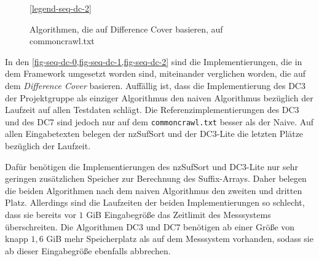 \begin{figure}[ht]

    \medskip
    \ref{legend-seq-dc-2}
    \caption{Algorithmen, die auf Difference Cover basieren, auf commoncrawl.txt}
    \label{fig-seq-dc-2}
\end{figure}
\FloatBarrier

In  den \cref{fig-seq-dc-0,fig-seq-dc-1,fig-seq-dc-2} sind die Implementierungen, die in dem \sacabench Framework umgesetzt worden sind, miteinander verglichen worden, die auf dem \emph{Difference Cover} basieren. Auffällig ist, dass die Implementierung des DC3 der Projektgruppe als einziger Algorithmus den naiven Algorithmus bezüglich der Laufzeit auf allen Testdaten schlägt. Die Referenzimplementierungen des DC3 und des DC7 sind jedoch nur auf dem \texttt{commoncrawl.txt} besser als der Naive. Auf allen Eingabetexten belegen der nzSufSort und der DC3-Lite die letzten Plätze bezüglich der Laufzeit.

Dafür benötigen die Implementierungen des nzSufSort und DC3-Lite nur sehr geringen zusätzlichen Speicher zur Berechnung des Suffix-Arrays. Daher belegen die beiden Algorithmen nach dem naiven Algorithmus den zweiten und dritten Platz. Allerdings sind die Laufzeiten der beiden Implementierungen so schlecht, dass sie bereits vor $1$ GiB Eingabegröße das Zeitlimit des Messsystems überschreiten. Die Algorithmen DC3 und DC7 benötigen ab einer Größe von knapp $1{,}6$ GiB mehr Speicherplatz als auf dem Messsystem vorhanden, sodass sie ab dieser Eingabegröße ebenfalls abbrechen.

